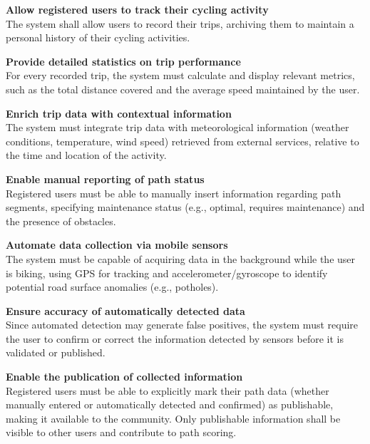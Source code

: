 \begin{enumerate}[label=\textbf{[G\arabic*]:}]
    \item \textbf{Allow registered users to track their cycling activity}
    \\
    The system shall allow users to record their trips, archiving them to maintain a personal history of their cycling activities.

    \item \textbf{Provide detailed statistics on trip performance}
    \\
    For every recorded trip, the system must calculate and display relevant metrics, such as the total distance covered and the average speed maintained by the user.

    \item \textbf{Enrich trip data with contextual information}
    \\
    The system must integrate trip data with meteorological information (weather conditions, temperature, wind speed) retrieved from external services, relative to the time and location of the activity.

    \item \textbf{Enable manual reporting of path status}
    \\
    Registered users must be able to manually insert information regarding path segments, specifying maintenance status (e.g., optimal, requires maintenance) and the presence of obstacles.

    \item \textbf{Automate data collection via mobile sensors}
    \\
    The system must be capable of acquiring data in the background while the user is biking, using GPS for tracking and accelerometer/gyroscope to identify potential road surface anomalies (e.g., potholes).

    \item \textbf{Ensure accuracy of automatically detected data}
    \\
    Since automated detection may generate false positives, the system must require the user to confirm or correct the information detected by sensors before it is validated or published.

    \item \textbf{Enable the publication of collected information}
    \\
    Registered users must be able to explicitly mark their path data (whether manually entered or automatically detected and confirmed) as publishable, making it available to the community. Only publishable information shall be visible to other users and contribute to path scoring.


\end{enumerate}
